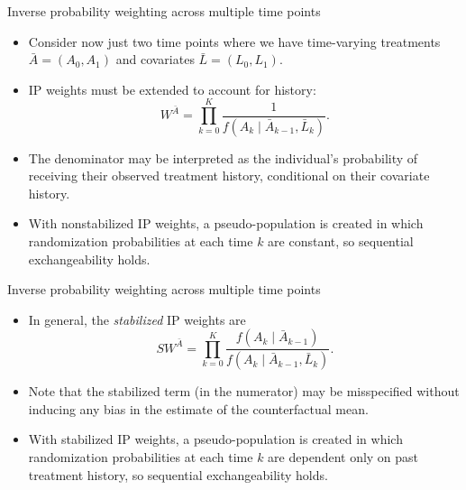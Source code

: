 \documentclass[ignorenonframetext,]{beamer}
\providecommand{\tightlist}{%
  \setlength{\itemsep}{0pt}\setlength{\parskip}{0pt}}
\begin{document}
\begin{frame}{Inverse probability weighting across multiple time points}
\protect\hypertarget{inverse-probability-weighting-across-multiple-time-points}{}

\begin{itemize}[<+->]
\tightlist
\item
  Consider now just two time points where we have time-varying
  treatments \(\bar{A} = (A_0, A_1)\) and covariates
  \(\bar{L} = (L_0, L_1)\).
\item
  IP weights must be extended to account for history:
  \[W^{\bar{A}} = \prod_{k=0}^K \frac{1}{f(A_k \mid \bar{A}_{k-1},
  \bar{L}_k)}.\]
\item
  The denominator may be interpreted as the individual's probability of
  receiving their observed treatment history, conditional on their
  covariate history.
\item
  With nonstabilized IP weights, a pseudo-population is created in which
  randomization probabilities at each time \(k\) are constant, so
  sequential exchangeability holds.
\end{itemize}

\end{frame}

\begin{frame}{Inverse probability weighting across multiple time points}
\protect\hypertarget{inverse-probability-weighting-across-multiple-time-points-1}{}

\begin{itemize}[<+->]
\tightlist
\item
  In general, the \emph{stabilized} IP weights are
  \[SW^{\bar{A}} = \prod_{k=0}^K \frac{f(A_k \mid \bar{A}_{k-1})}
  {f(A_k \mid \bar{A}_{k-1}, \bar{L}_k)}.\]
\item
  Note that the stabilized term (in the numerator) may be misspecified
  without inducing any bias in the estimate of the counterfactual mean.
\item
  With stabilized IP weights, a pseudo-population is created in which
  randomization probabilities at each time \(k\) are dependent only on
  past treatment history, so sequential exchangeability holds.
\end{itemize}

\end{frame}
\end{document}
